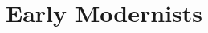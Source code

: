 \documentclass[class=article, crop=false]{standalone}
\begin{document}
\section{Early Modernists}
\end{document}
